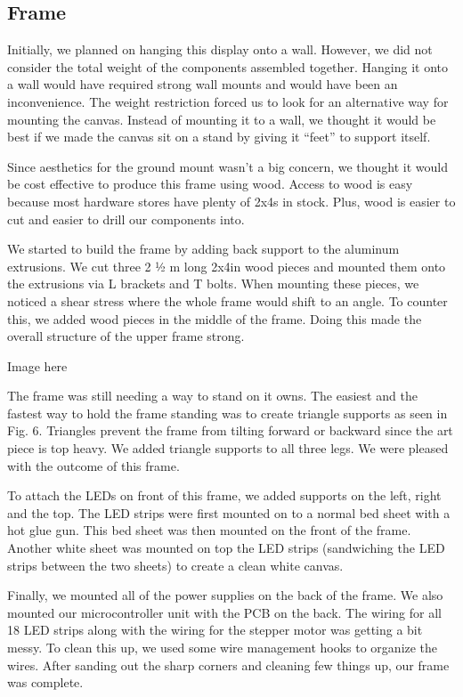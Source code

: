 \documentclass[12pt]{article}
\begin{document}
\subsection{Frame}
Initially, we planned on hanging this display onto a wall. However, we did not consider the total weight of the components assembled together. Hanging it onto a wall would have required strong wall mounts and would have been an inconvenience. The weight restriction forced us to look for an alternative way for mounting the canvas. Instead of mounting it to a wall, we thought it would be best if we made the canvas sit on a stand by giving it “feet” to support itself. 

Since aesthetics for the ground mount wasn’t a big concern, we thought it would be cost effective to produce this frame using wood. Access to wood is easy because most hardware stores have plenty of 2x4s in stock. Plus, wood is easier to cut and easier to drill our components into.

We started to build the frame by adding back support to the aluminum extrusions. We cut three 2 ½ m long 2x4in wood pieces and mounted them onto the extrusions via L brackets and T bolts. When mounting these pieces, we noticed a shear stress where the whole frame would shift to an angle. To counter this, we added wood pieces in the middle of the frame. Doing this made the overall structure of the upper frame strong.

Image here

The frame was still needing a way to stand on it owns. The easiest and the fastest way to hold the frame standing was to create triangle supports as seen in Fig. 6. Triangles prevent the frame from tilting forward or backward since the art piece is top heavy. We added triangle supports to all three legs. We were pleased with the outcome of this frame.

To attach the LEDs on front of this frame, we added supports on the left, right and the top. The LED strips were first mounted on to a normal bed sheet with a hot glue gun. This bed sheet was then mounted on the front of the frame. Another white sheet was mounted on top the LED strips (sandwiching the LED strips between the two sheets) to create a clean white canvas.

Finally, we mounted all of the power supplies on the back of the frame. We also mounted our microcontroller unit with the PCB on the back. The wiring for all 18 LED strips along with the wiring for the stepper motor was getting a bit messy. To clean this up, we used some wire management hooks to organize the wires. After sanding out the sharp corners and cleaning few things up, our frame was complete.
\end{document}
